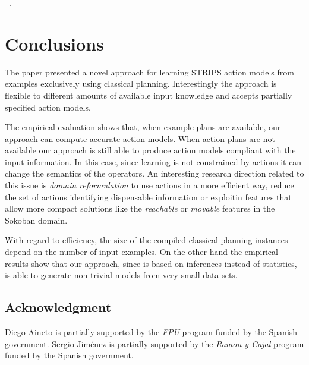 \documentclass[letterpaper]{article} %
\begin{document}
~\cite{stern2017efficient}.


\section{Conclusions}
The paper presented a novel approach for learning STRIPS action models from examples exclusively using classical planning. Interestingly the approach is flexible to different amounts of available input knowledge and accepts partially specified action models.   

The empirical evaluation shows that, when example plans are available, our approach can compute accurate action models. When action plans are not available our approach is still able to produce action models compliant with the input information. In this case, since learning is not constrained by actions it can change the semantics of the operators. An interesting research direction related to this issue is {\em domain reformulation} to use actions in a more efficient way, reduce the set of actions identifying dispensable information or exploitin features that allow more compact solutions like the {\em reachable} or {\em movable} features in the Sokoban domain. 

With regard to efficiency, the size of the compiled classical planning instances depend on the number of input examples. On the other hand the empirical results show that our approach, since is based on inferences instead of statistics, is able to generate non-trivial models from very small data sets.

\subsection*{Acknowledgment}
\begin{small}
Diego Aineto is partially supported by the {\it FPU} program funded by the Spanish government. Sergio Jim\'enez is partially supported by the {\it Ramon y Cajal} program funded by the Spanish government.
\end{small}

\newpage



\end{document}
